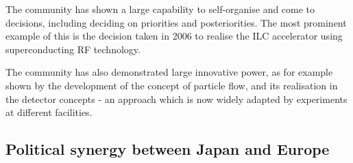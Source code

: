 \documentclass[%
 reprint,
 amsmath,amssymb,
 aps,
]{revtex4-1}
\begin{document}
The community has shown a large capability to self-organise and come to 
decisions, including deciding on priorities and posteriorities. The most 
prominent example of this is the decision taken in 2006 to realise the ILC 
accelerator using superconducting RF technology. 

The community has also demonstrated large innovative power, as for example shown 
by the development of the concept of particle flow, and its realisation in the 
detector concepts - an approach which is now widely adapted by experiments at 
different facilities. 

\subsection{\label{sec:discussionPol}Political synergy between Japan and Europe}
\end{document}
